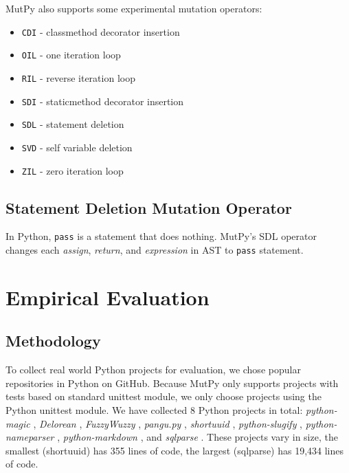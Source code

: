 \documentclass[12pt]{article}
\begin{document}
MutPy also supports some experimental mutation operators:

\begin{itemize}
  \itemsep0em 
  \item \texttt{CDI} - classmethod decorator insertion
  \item \texttt{OIL} - one iteration loop
  \item \texttt{RIL} - reverse iteration loop
  \item \texttt{SDI} - staticmethod decorator insertion
  \item \texttt{SDL} - statement deletion
  \item \texttt{SVD} - self variable deletion
  \item \texttt{ZIL} - zero iteration loop
\end{itemize}

\subsection{Statement Deletion Mutation Operator}

In Python, \texttt{pass} is a statement that does nothing. MutPy's SDL operator changes each \emph{assign}, \emph{return}, and \emph{expression} in AST to \texttt{pass} statement.

\section{Empirical Evaluation}

\subsection{Methodology}

To collect real world Python projects for evaluation, we chose popular repositories in Python on GitHub. Because MutPy only supports projects with tests based on standard unittest module, we only choose projects using the Python unittest module. We have collected 8 Python projects in total: \emph{python-magic} \cite{python-magic}, \emph{Delorean} \cite{delorean}, \emph{FuzzyWuzzy} \cite{fuzzywuzzy}, \emph{pangu.py} \cite{pangu.py}, \emph{shortuuid} \cite{shortuuid}, \emph{python-slugify} \cite{python-slugify}, \emph{python-nameparser} \cite{python-nameparser}, \emph{python-markdown} \cite{python-markdown}, and \emph{sqlparse} \cite{sqlparse}. These projects vary in size, the smallest (shortuuid) has 355 lines of code, the largest (sqlparse) has 19,434 lines of code.
\end{document}
